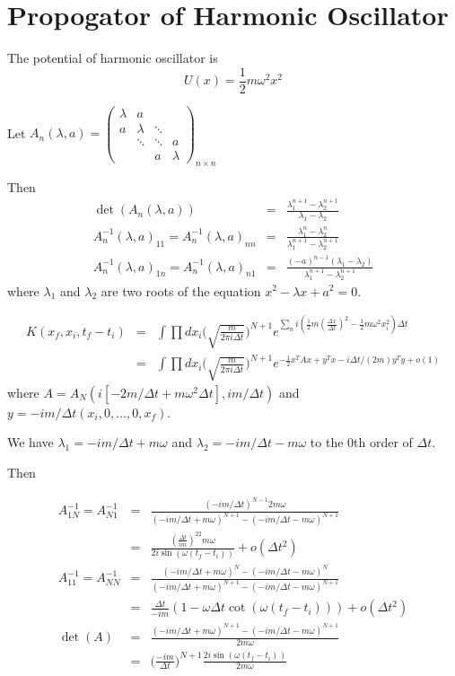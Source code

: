 \documentclass[12pt]{book}
\begin{document}
	\section{Propogator of Harmonic Oscillator}
	
	The potential of harmonic oscillator is
	\begin{equation}
		U(x)=\frac 12 m\omega^2x^2
	\end{equation}
	
	Let $A_n(\lambda,a)=\begin{pmatrix}
		\lambda&a&&\\
		a&\lambda&\ddots&\\
		&\ddots&\ddots&a\\
		&&a&\lambda
	\end{pmatrix}_{n\times n}$
	
	Then
	\begin{eqnarray}
		\det(A_n(\lambda,a))&=&\frac{\lambda_1^{n+1}-\lambda_2^{n+1}}{\lambda_1-\lambda_2}\\
		A^{-1}_n(\lambda,a)_{11}=A^{-1}_n(\lambda,a)_{nn}&=&\frac{\lambda_1^{n}-\lambda_2^{n}}{\lambda_1^{n+1}-\lambda_2^{n+1}}\\
		A^{-1}_n(\lambda,a)_{1n}=A^{-1}_n(\lambda,a)_{n1}&=&\frac{(-a)^{n-1}(\lambda_1-\lambda_2)}{\lambda_1^{n+1}-\lambda_2^{n+1}}
	\end{eqnarray}
	where $\lambda_1$ and $\lambda_2$ are two roots of the equation $x^2-\lambda x+a^2=0$.
	
	
	\begin{eqnarray}
		K(x_f,x_i,t_f-t_i)&=& \int\prod dx_i\bigg(\sqrt{\frac{m}{2\pi i\Delta t}}\bigg)^{N+1}e^{\sum_n i(\frac 12m(\frac{\Delta x}{\Delta t})^2-\frac 12 m\omega^2x_i^2)\Delta t}\\
		&=& \int\prod dx_i\bigg(\sqrt{\frac{m}{2\pi i\Delta t}}\bigg)^{N+1}e^{-\frac 12x^TAx+y^Tx-i\Delta t/(2m)y^Ty+o(1)}
	\end{eqnarray}
	where $A=A_N(i[-2m/\Delta t+ m\omega^2\Delta t],im/\Delta t)$ and $y=-im/\Delta t(x_i,0,\dots,0,x_f)$.
	
	We have $\lambda_1=-im/\Delta t+m\omega$ and $\lambda_2=-im/\Delta t-m\omega$ to the 0th order of $\Delta t$.
	
	Then 
	
	\begin{eqnarray}
		A^{-1}_{1N}=A^{-1}_{N1}&=&\frac{(-im/\Delta t)^{N-1}2m\omega}{(-im/\Delta t+m\omega)^{N+1}-(-im/\Delta t-m\omega)^{N+1}}\\
		&=&\frac{(\frac {\Delta t}{im})^22m\omega}{2i\sin(\omega(t_f-t_i))}+o(\Delta t^2)\\
		A^{-1}_{11}=A^{-1}_{NN}&=&\frac{(-im/\Delta t+m\omega)^N-(-im/\Delta t-m\omega)^N}{(-im/\Delta t+m\omega)^{N+1}-(-im/\Delta t-m\omega)^{N+1}}\\
		&=&\frac{\Delta t}{-im}(1-\omega\Delta t\cot(\omega(t_f-t_i)))+o(\Delta t^2)\\
		\det(A)&=&\frac{(-im/\Delta t+m\omega)^{N+1}-(-im/\Delta t-m\omega)^{N+1}}{2m\omega}\\
		&=&\Big(\frac {-im}{\Delta t}\Big)^{N+1}\frac{2i\sin(\omega(t_f-t_i))}{2m\omega}
	\end{eqnarray}
	
\end{document}
